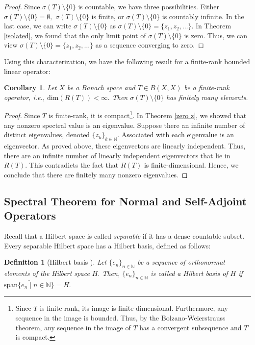 \documentclass[12pt,a4paper]{article}
\theoremstyle{boldthm}
\newtheorem{corollary}[theorem]{Corollary}
\theoremstyle{bolddefn}
\newtheorem{definition}[theorem]{Definition}
\begin{document}
\begin{proof}
Since $\sigma(T) \setminus \{0\}$ is countable, we have three possibilities. Either $\sigma(T) \setminus \{0\} = \emptyset,$ $\sigma(T) \setminus \{0\}$ is finite, or $\sigma(T) \setminus \{0\}$ is countably infinite. In the last case, we can write $\sigma(T) \setminus \{0\}$ as $\sigma(T) \setminus \{0\} = \{z_1, z_2, \dots \}.$ In Theorem \ref{isolated}, we found that the only limit point of $\sigma(T) \setminus \{0\}$ is zero. Thus, we can view $\sigma(T) \setminus \{0\} = \{z_1, z_2, \dots \}$ as a sequence converging to zero. 

\end{proof}

Using this characterization, we have the following result for a finite-rank bounded linear operator:
\begin{corollary}
    Let $X$ be a Banach space and $T \in B(X, X)$ be a finite-rank operator, i.e., $\text{dim}(R(T)) < \infty.$ Then $\sigma(T) \setminus \{0\}$ has finitely many elements. 
\end{corollary}
\begin{proof}
    Since $T$ is finite-rank, it is compact\footnote{Since $T$ is finite-rank, its image is finite-dimensional. Furthermore, any sequence in the image is bounded. Thus, by the Bolzano-Weierstrauss theorem, any sequence in the image of $T$ has a convergent subsequence and $T$ is compact.}. In Theorem \ref{zero z}, we showed that any nonzero spectral value is an eigenvalue. Suppose there an infinite number of distinct eigenvalues, denoted $\{z_k\}_{k \in \mathbb{N}}.$ Associated with each eigenvalue is an eigenvector. As proved above, these eigenvectors are linearly independent. Thus, there are an infinite number of linearly independent eigenvectors that lie in $R(T).$ This contradicts the fact that $R(T)$ is finite-dimensional. Hence, we conclude that there are finitely many nonzero eigenvalues. 
\end{proof}

\subsection{Spectral Theorem for Normal and Self-Adjoint Operators}

Recall that a Hilbert space is called \textit{separable} if it has a dense countable subset. Every separable Hilbert space has a Hilbert basis, defined as follows:
\begin{definition}[Hilbert basis \cite{umberto}]
    Let $\{e_n\}_{n \in \mathbb{N}}$ be a sequence of orthonormal elements of the Hilbert space $H.$ Then, $\{e_n\}_{n \in \mathbb{N}}$ is called a Hilbert basis of $H$ if $\overline{\text{span}\{e_n \mid n \in \mathbb{N} \} } = H.$
\end{definition}
\end{document}
